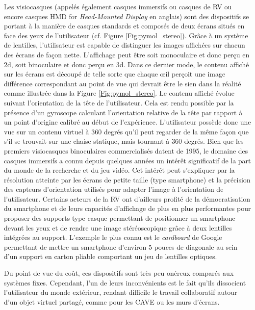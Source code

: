 Les visiocasques (appelés également casques immersifs ou casques de RV ou encore casques HMD for \textit{Head-Mounted Display} en anglais) sont des dispositifs se portant à la manière de casques standards et composés de deux écrans situés en face des yeux de l'utilisateur (cf. Figure \ref{Fig:pymol_stereo}). Grâce à un système de lentilles, l'utilisateur est capable de distinguer les images affichées sur chacun des écrans de façon nette. L'affichage peut être soit monoculaire et donc perçu en 2d, soit binoculaire et donc perçu en 3d. Dans ce dernier mode, le contenu affiché sur les écrans est découpé de telle sorte que chaque œil perçoit une image différence correspondant au point de vue qui devrait être le sien dans la réalité comme illustrée dans la Figure \ref{Fig:pymol_stereo}. Le contenu affiché évolue suivant l'orientation de la tête de l'utilisateur. Cela est rendu possible par la présence d'un gyroscope calculant l'orientation relative de la tête par rapport à un point d'origine calibré au début de l'expérience. L'utilisateur possède donc une vue sur un contenu virtuel à 360 degrés qu'il peut regarder de la même façon que s'il se trouvait sur une chaise statique, mais tournant à 360 degrés. Bien que les premiers visiocasques binoculaires commercialisés datent de 1995, le domaine des casques immersifs a connu depuis quelques années un intérêt significatif de la part du monde de la recherche et du jeu vidéo. Cet intérêt peut s'expliquer par la résolution atteinte par les écrans de petite taille (type smartphone) et la précision des capteurs d'orientation utilisés pour adapter l'image à l'orientation de l'utilisateur. Certains acteurs de la RV ont d'ailleurs profité de la démocratisation du smartphone et de leurs capacités d'affichage de plus en plus performantes pour proposer des supports type casque permettant de positionner un smartphone devant les yeux et de rendre une image stéréoscopique grâce à deux lentilles intégrées au support. L'exemple le plus connu est le \textit{cardboard} de Google permettant de mettre un smartphone d'environ 5 pouces de diagonale au sein d'un support en carton pliable comportant un jeu de lentilles optiques. 

Du point de vue du coût, ces dispositifs sont très peu onéreux comparés aux systèmes fixes. Cependant, l'un de leurs inconvénients est le fait qu'ils dissocient l'utilisateur du monde extérieur, rendant difficile le travail collaboratif autour d'un objet virtuel partagé, comme pour les CAVE ou les murs d'écrans.

